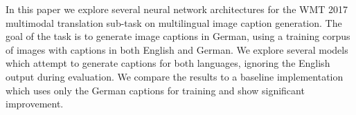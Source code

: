In this paper we explore several neural network architectures for the WMT 2017 multimodal translation sub-task on multilingual image caption generation. The goal of the task is to generate image captions in German, using a training corpus of images with captions in both English and German. We explore several models which attempt to generate captions for both languages, ignoring the English output during evaluation. We compare the results to a baseline implementation which uses only the German captions for training and show significant improvement.
